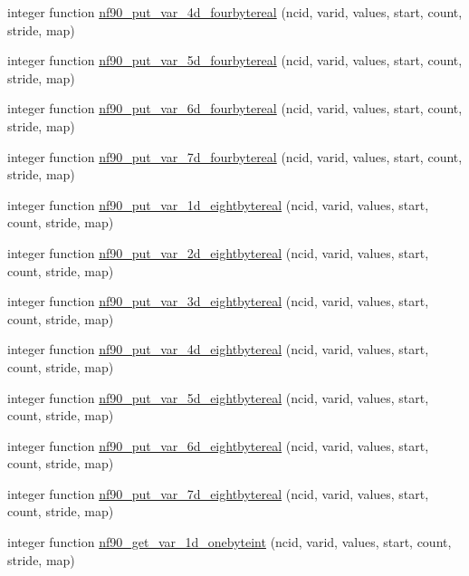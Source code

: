 \begin{DoxyCompactItemize}
\item 
integer function \hyperlink{netcdf__expanded_8f90_a17d00c5ef5644148863f9676a3d4657e}{nf90\+\_\+put\+\_\+var\+\_\+4d\+\_\+fourbytereal} (ncid, varid, values, start, count, stride, map)
\item 
integer function \hyperlink{netcdf__expanded_8f90_ad4188948f44fd394cbe276c9290c6678}{nf90\+\_\+put\+\_\+var\+\_\+5d\+\_\+fourbytereal} (ncid, varid, values, start, count, stride, map)
\item 
integer function \hyperlink{netcdf__expanded_8f90_ab4bd3a98db7c6b28fa9ff5378db833c9}{nf90\+\_\+put\+\_\+var\+\_\+6d\+\_\+fourbytereal} (ncid, varid, values, start, count, stride, map)
\item 
integer function \hyperlink{netcdf__expanded_8f90_a01f9cc3fed62c2b4aafd6aa65e5b38c3}{nf90\+\_\+put\+\_\+var\+\_\+7d\+\_\+fourbytereal} (ncid, varid, values, start, count, stride, map)
\item 
integer function \hyperlink{netcdf__expanded_8f90_ae46f0be9c41a4c9c02f471efa43cd2fe}{nf90\+\_\+put\+\_\+var\+\_\+1d\+\_\+eightbytereal} (ncid, varid, values, start, count, stride, map)
\item 
integer function \hyperlink{netcdf__expanded_8f90_a2a4dd99b7f94ec3567a026e9dc1e890b}{nf90\+\_\+put\+\_\+var\+\_\+2d\+\_\+eightbytereal} (ncid, varid, values, start, count, stride, map)
\item 
integer function \hyperlink{netcdf__expanded_8f90_ab24c68271006887283a4e0c3b53abc86}{nf90\+\_\+put\+\_\+var\+\_\+3d\+\_\+eightbytereal} (ncid, varid, values, start, count, stride, map)
\item 
integer function \hyperlink{netcdf__expanded_8f90_ae02380d44b00acf5dd1587601c37234e}{nf90\+\_\+put\+\_\+var\+\_\+4d\+\_\+eightbytereal} (ncid, varid, values, start, count, stride, map)
\item 
integer function \hyperlink{netcdf__expanded_8f90_a7849510bde9b49e666c4418dc9e43aee}{nf90\+\_\+put\+\_\+var\+\_\+5d\+\_\+eightbytereal} (ncid, varid, values, start, count, stride, map)
\item 
integer function \hyperlink{netcdf__expanded_8f90_a94deba4e6c99586106fb2328c68abdf0}{nf90\+\_\+put\+\_\+var\+\_\+6d\+\_\+eightbytereal} (ncid, varid, values, start, count, stride, map)
\item 
integer function \hyperlink{netcdf__expanded_8f90_a0432ac8d8e80a5083fcd4a389e05066e}{nf90\+\_\+put\+\_\+var\+\_\+7d\+\_\+eightbytereal} (ncid, varid, values, start, count, stride, map)
\item 
integer function \hyperlink{netcdf__expanded_8f90_a1cea5b36160fa3e9a65103d421650a9c}{nf90\+\_\+get\+\_\+var\+\_\+1d\+\_\+onebyteint} (ncid, varid, values, start, count, stride, map)

\end{DoxyCompactItemize}
